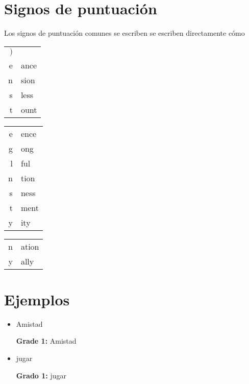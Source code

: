 \documentclass[draft]{article}
\newcommand{\mytable}[1]{%
    \enskip\begin{tabular}[t]{r|l} 
    \hline #1 \hline
    \end{tabular}\enskip}
\begin{document}
\section{Signos de puntuación}

Los signos de puntuación comunes se escriben se escriben directamente cómo

\begin{center}
	\mytable{
		$)$&\braille{)} \\
		e&ance \\
		n&sion \\
		s&less \\
		t&ount \\
	}
	\mytable{
		e&ence \\
		g&ong \\
		l&ful \\
		n&tion \\
		s&ness \\
		t&ment \\
		y&ity \\
	}
	\mytable{
		n&ation \\
		y&ally \\
	}
\end{center}


\section{Ejemplos}

\sloppy
\begin{itemize}
	\item Amistad 
	
	{\bf Grade 1:} Amistad \\
	

	
\end{itemize}

\begin{itemize}
	\item jugar
	
	{\bf Grado 1:} jugar \\
	
	
	
\end{itemize}
\end{document}
